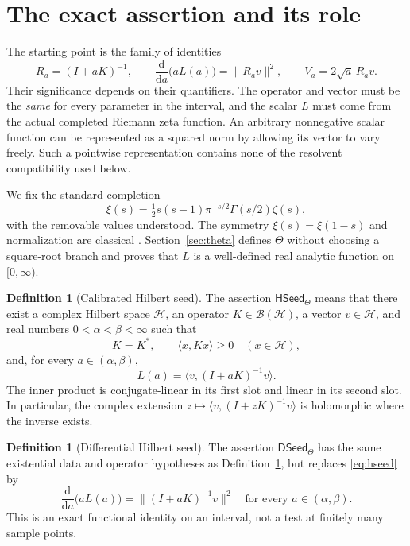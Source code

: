 \documentclass[11pt,a4paper]{article}
\numberwithin{equation}{section}
\theoremstyle{definition}
\newtheorem{definition}[theorem]{Definition}
\theoremstyle{remark}
\newcommand{\HH}{\mathcal H}
\newcommand{\BB}{\mathcal B}
\newcommand{\ip}[2]{\langle #1,#2\rangle}
\newcommand{\norm}[1]{\lVert #1\rVert}
\newcommand{\HSeed}{\mathsf{HSeed}_{\Theta}}
\newcommand{\DSeed}{\mathsf{DSeed}_{\Theta}}
\begin{document}
\section[Assertion and scope]{The exact assertion and its role}\label{sec:assertion}

The starting point is the family of identities
\begin{equation}\label{eq:anchor-intro}
R_a=(I+aK)^{-1},\qquad
\frac{\mathrm d}{\mathrm da}\bigl(aL(a)\bigr)=\norm{R_av}^{2},\qquad
V_a=2\sqrt a\,R_av.
\end{equation}
Their significance depends on their quantifiers. The operator and vector
must be the \emph{same} for every parameter in the interval, and the scalar
$L$ must come from the actual completed Riemann zeta function. An arbitrary
nonnegative scalar function can be represented as a squared norm by
allowing its vector to vary freely. Such a pointwise representation contains
none of the resolvent compatibility used below.

We fix the standard completion
\begin{equation}\label{eq:xi}
\xi(s)=\tfrac12s(s-1)\pi^{-s/2}\Gamma(s/2)\zeta(s),
\end{equation}
with the removable values understood. The symmetry $\xi(s)=\xi(1-s)$
and normalization are classical \cite{dlmf-reflection}. Section~\ref{sec:theta}
defines $\Theta$ without choosing a square-root branch and proves that
$L$ is a well-defined real analytic function on $[0,\infty)$.

\begin{definition}[Calibrated Hilbert seed]\label{def:hseed}
The assertion $\HSeed$ means that there exist a complex Hilbert space
$\HH$, an operator $K\in\BB(\HH)$, a vector $v\in\HH$, and real numbers
$0<\alpha<\beta<\infty$ such that
\begin{equation}\label{eq:seed-hypotheses}
K=K^*,\qquad \ip{x}{Kx}\geq0\quad(x\in\HH),
\end{equation}
and, for every $a\in(\alpha,\beta)$,
\begin{equation}\label{eq:hseed}
L(a)=\ip{v}{(I+aK)^{-1}v}.
\end{equation}
The inner product is conjugate-linear in its first slot and linear in its
second slot. In particular, the complex extension
$z\mapsto\ip{v}{(I+zK)^{-1}v}$ is holomorphic where the inverse exists.
\end{definition}

\begin{definition}[Differential Hilbert seed]\label{def:dseed}
The assertion $\DSeed$ has the same existential data and operator
hypotheses as Definition~\ref{def:hseed}, but replaces
\eqref{eq:hseed} by
\begin{equation}\label{eq:dseed}
\frac{\mathrm d}{\mathrm da}\bigl(aL(a)\bigr)
=\norm{(I+aK)^{-1}v}^{2}
\quad\text{for every }a\in(\alpha,\beta).
\end{equation}
This is an exact functional identity on an interval, not a test at finitely
many sample points.
\end{definition}
\end{document}

